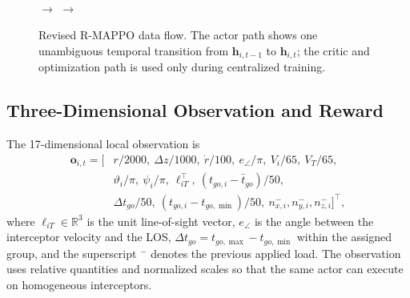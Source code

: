 \documentclass[lettersize,journal]{IEEEtran}
\begin{document}
\begin{figure}[!t]
\centering
{}\\[5pt]
\(\longrightarrow\)
\(\longrightarrow\)
\caption{Revised R-MAPPO data flow. The actor path shows one unambiguous temporal
transition from \(\mathbf{h}_{i,t-1}\) to \(\mathbf{h}_{i,t}\); the critic and
optimization path is used only during centralized training.}
\label{fig:algorithm_flow}
\end{figure}

\subsection{Three-Dimensional Observation and Reward}
\label{subsec:state_reward}

The 17-dimensional local observation is
\begin{equation}
\label{eq:observation_space}
\begin{split}
\mathbf{o}_{i,t}=[&
r/2000,\ \Delta z/1000,\ \dot r/100,\ e_\angle/\pi,\
V_i/65,\ V_T/65,\\
&\vartheta_i/\pi,\ \psi_i/\pi,\ \boldsymbol{\ell}_{iT}^\top,\
(t_{go,i}-\bar t_{go})/50,\\
&\Delta t_{go}/50,\ (t_{go,i}-t_{go,\min})/50,\
n_{x,i}^{-},n_{y,i}^{-},n_{z,i}^{-}]^\top ,
\end{split}
\end{equation}
where \(\boldsymbol{\ell}_{iT}\in\mathbb{R}^3\) is the unit line-of-sight
vector, \(e_\angle\) is the angle between the interceptor velocity and the LOS,
\(\Delta t_{go}=t_{go,\max}-t_{go,\min}\) within the assigned group, and the
superscript \({}^{-}\) denotes the previous applied load. The observation uses
relative quantities and normalized scales so that the same actor can execute on
homogeneous interceptors.
\end{document}
